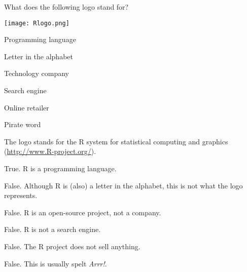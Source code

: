
\begin{question}
What does the following logo stand for?

\texttt{[image: Rlogo.png]}

\begin{answerlist}
  \item Programming language
  \item Letter in the alphabet
  \item Technology company
  \item Search engine
  \item Online retailer
  \item Pirate word
\end{answerlist}
\end{question}

\begin{solution}
The logo stands for the R system for statistical computing and graphics (\url{http://www.R-project.org/}).

\begin{answerlist}
  \item True. R is a programming language.
  \item False. Although R is (also) a letter in the alphabet, this is not what the logo represents.
  \item False. R is an open-source project, not a company.
  \item False. R is not a search engine.
  \item False. The R project does not sell anything.
  \item False. This is usually spelt \emph{Arrr!}.
\end{answerlist}
\end{solution}

